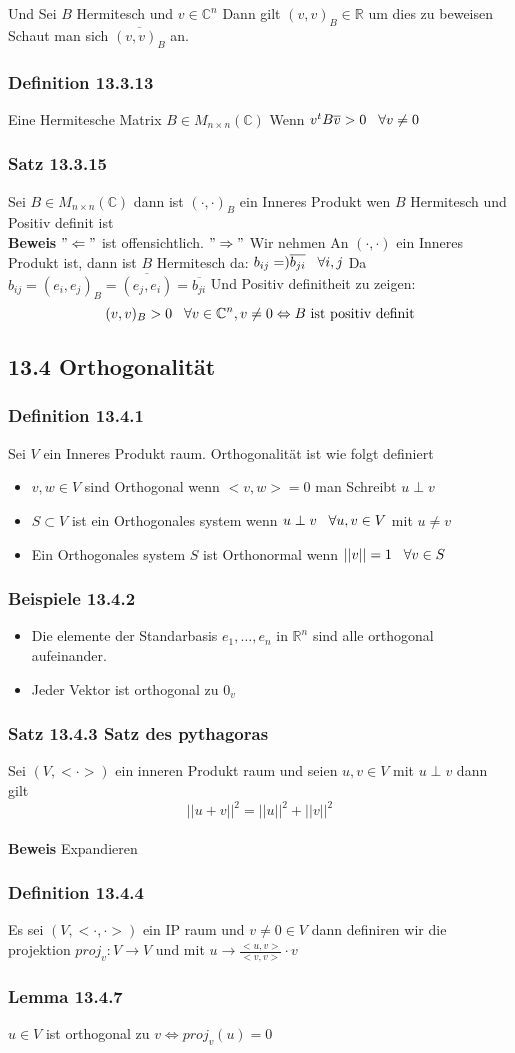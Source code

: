 \documentclass{article}
\newcommand{\smspc}{\hspace{0.3cm}}
\newcommand{\satz}[1]{\subsubsection*{Satz {#1}}}
\newcommand{\beweis}{\\\textbf{Beweis }}
\newcommand{\beispiel}[1]{\subsubsection*{Beispiele {#1}}}
\newcommand{\lemma}[1]{\subsubsection*{Lemma {#1}}}
\newcommand{\definition}[1]{\subsubsection*{Definition {#1}}}
\begin{document}
Und Sei $B$ Hermitesch und $v\in\mathbb{C}^n$ Dann gilt $(v,v)_B\in\mathbb{R}$ um dies zu beweisen Schaut man sich $\overline{(v,v)_B} $ an.
\definition{13.3.13} Eine Hermitesche Matrix $B\in M_{n\times n}(\mathbb{C})$ Wenn $v^tB\overline{v}>0\smspc\forall v\neq0$
\satz{13.3.15} Sei $B\in M_{n\times n}(\mathbb{C})$ dann ist $(\cdot,\cdot)_B$ ein Inneres Produkt wen $B$ Hermitesch und Positiv definit ist
\beweis $"\Leftarrow"$ ist offensichtlich.\newline
$"\Rightarrow"$ Wir nehmen An $(\cdot,\cdot)$ ein Inneres Produkt ist, dann ist $B$ Hermitesch da: $b_{ij}=)\overline{b_{ji}}\smspc\forall i,j$ Da $b_{ij}=(e_i,e_j)_B=\overline{(e_j,e_i)}=\overline{b_{ji}}$
Und Positiv definitheit zu zeigen: \[(v,v)_B>0\smspc\forall v\in\mathbb{C}^n, v\neq 0\Leftrightarrow B\text{ ist positiv definit}\]
\subsection*{13.4 Orthogonalität}
\definition{13.4.1} Sei $V$ ein Inneres Produkt raum. Orthogonalität ist wie folgt definiert
\begin{itemize}
  \item{$v,w\in V$ sind Orthogonal wenn $<v,w>=0$ man Schreibt $u\perp v$}
  \item{$S\subset V$ ist ein Orthogonales system wenn $u\perp v\smspc \forall u,v\in V$ mit $u\neq v$}
  \item{Ein Orthogonales system $S$ ist Orthonormal wenn $||v||=1\smspc\forall v\in S$}
\end{itemize}
\beispiel{13.4.2}
\begin{itemize}
  \item{Die elemente der Standarbasis $e_1,\hdots,e_n$ in $\mathbb{R}^n$ sind alle orthogonal aufeinander.}
  \item{Jeder Vektor ist orthogonal zu $0_v$}
\end{itemize}
\satz{13.4.3 Satz des pythagoras} Sei $(V,<\cdot>)$ ein inneren Produkt raum und seien $u,v\in V$ mit $u\perp v$ dann gilt\[||u+v||^2=||u||^2+||v||^2\]
\beweis Expandieren
\definition{13.4.4} Es sei $(V,<\cdot,\cdot>)$ ein IP raum und $v\neq0\in V$ dann definiren wir die projektion $proj_v:V\rightarrow V$ und mit $u\rightarrow \frac{<u,v>}{<v,v>}\cdot v$
\lemma{13.4.7} $u\in V$ ist orthogonal zu $v\Leftrightarrow proj_v(u)=0$
\end{document}
